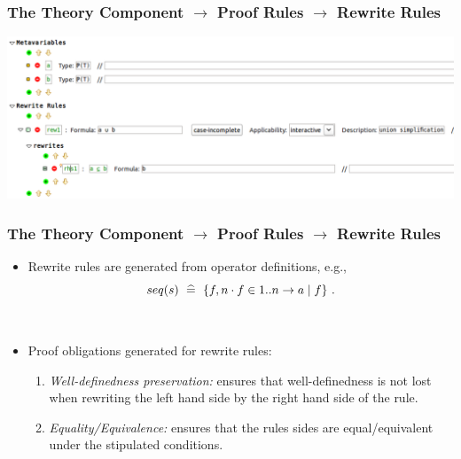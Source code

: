 \documentclass{beamer}
\begin{document}
	\begin{frame}
		\frametitle{The Theory Component $\rightarrow$ Proof Rules $\rightarrow$ Rewrite Rules}
		\begin{center}
			\includegraphics[scale=0.4]{RewRule}
		\end{center}
	\end{frame}
	\begin{frame}
		\frametitle{The Theory Component $\rightarrow$ Proof Rules $\rightarrow$ Rewrite Rules}
		\begin{itemize}
			\item Rewrite rules are generated from operator definitions, e.g.,
				\begin{equation*}
					seq(s)~\mathrel{\widehat=}~\{f,n \cdot f\in 1..n \rightarrow a \mid f\}~.
				\end{equation*}

~

			\item Proof obligations generated for rewrite rules:
				\begin{enumerate}
					\item \emph{Well-definedness preservation:} ensures that well-definedness is not lost when rewriting the left hand side by the right hand side of the rule.
					\item \emph{Equality/Equivalence:} ensures that the rules sides are equal/equivalent under the stipulated conditions.
				\end{enumerate}
		\end{itemize}
		
	\end{frame}
\end{document}
